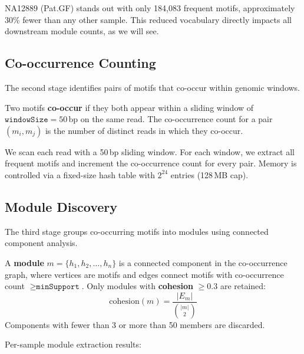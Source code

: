 \documentclass{../yalumba}
\begin{document}

NA12889 (Pat.GF) stands out with only 184{,}083 frequent motifs,
approximately 30\% fewer than any other sample.  This reduced vocabulary
directly impacts all downstream module counts, as we will see.

\subsection{Co-occurrence Counting}

The second stage identifies pairs of motifs that co-occur within genomic
windows.

\begin{definition}
Two motifs \textbf{co-occur} if they both appear within a sliding window of
$\texttt{windowSize} = 50$\,bp on the same read.  The co-occurrence count
for a pair $(m_i, m_j)$ is the number of distinct reads in which they
co-occur.
\end{definition}

We scan each read with a 50\,bp sliding window.  For each window, we extract
all frequent motifs and increment the co-occurrence count for every pair.
Memory is controlled via a fixed-size hash table with $2^{24}$ entries
(128\,MB cap).

\subsection{Module Discovery}

The third stage groups co-occurring motifs into modules using connected
component analysis.

\begin{definition}
A \textbf{module} $m = \{h_1, h_2, \ldots, h_n\}$ is a connected component
in the co-occurrence graph, where vertices are motifs and edges connect motifs
with co-occurrence count $\geq \texttt{minSupport}$.  Only modules with
\textbf{cohesion} $\geq 0.3$ are retained:
\begin{equation}
  \text{cohesion}(m) = \frac{|E_m|}{\binom{|m|}{2}}
  \label{eq:cohesion}
\end{equation}
Components with fewer than 3 or more than 50 members are discarded.
\end{definition}

Per-sample module extraction results:
\end{document}
